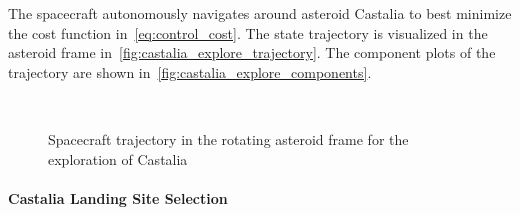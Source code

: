 The spacecraft autonomously navigates around asteroid Castalia to best minimize the cost function in~\cref{eq:control_cost}.
The state trajectory is visualized in the asteroid frame in~\cref{fig:castalia_explore_trajectory}.
The component plots of the trajectory are shown in~\cref{fig:castalia_explore_components}.
\begin{figure}[htbp]
    \centering
    \\%
    \caption{Spacecraft trajectory in the rotating asteroid frame for the exploration of Castalia~\label{fig:castalia_trajectory}}
\end{figure}

\paragraph{Castalia Landing Site Selection}

